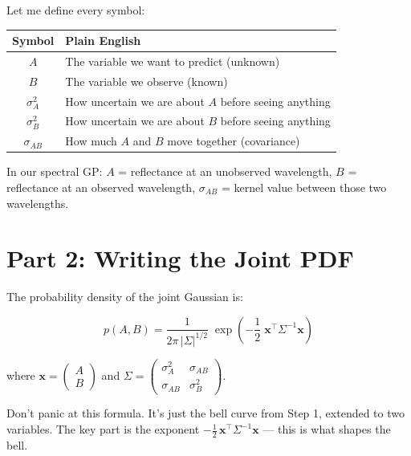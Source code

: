 \documentclass[11pt, a4paper]{article}
\newcommand{\gut}[1]{\begin{tcolorbox}[colback=lightyellow, colframe=orange!50, title=Gut feeling]#1\end{tcolorbox}}
\begin{document}
Let me define every symbol:

\begin{center}
\begin{tabular}{cl}
\toprule
\textbf{Symbol} & \textbf{Plain English} \\
\midrule
$A$ & The variable we want to predict (unknown) \\
$B$ & The variable we observe (known) \\
$\sigma_A^2$ & How uncertain we are about $A$ before seeing anything \\
$\sigma_B^2$ & How uncertain we are about $B$ before seeing anything \\
$\sigma_{AB}$ & How much $A$ and $B$ move together (covariance) \\
\bottomrule
\end{tabular}
\end{center}

\gut{
In our spectral GP: $A$ = reflectance at an unobserved wavelength, $B$ = reflectance at an observed wavelength, $\sigma_{AB}$ = kernel value between those two wavelengths.
}


\section*{\color{secblue}Part 2: Writing the Joint PDF}

The probability density of the joint Gaussian is:

\begin{equation}
p(A, B) = \frac{1}{2\pi\,|\Sigma|^{1/2}} \;\exp\!\left( -\frac{1}{2} \;\mathbf{x}^\top \Sigma^{-1} \mathbf{x} \right)
\tag{P2}
\end{equation}

where $\mathbf{x} = \begin{pmatrix} A \\ B \end{pmatrix}$ and $\Sigma = \begin{pmatrix} \sigma_A^2 & \sigma_{AB} \\ \sigma_{AB} & \sigma_B^2 \end{pmatrix}$.

\gut{
Don't panic at this formula. It's just the bell curve from Step 1, extended to two variables. The key part is the exponent $-\frac{1}{2}\,\mathbf{x}^\top \Sigma^{-1} \mathbf{x}$ --- this is what shapes the bell.
}


\end{document}
